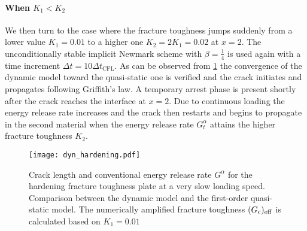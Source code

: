 \paragraph{When $K_1<K_2$} We then turn to the case where the fracture toughness jumps suddenly from a lower value $K_1=0.01$ to a higher one $K_2=2K_1=0.02$ at $x=2$. The unconditionally stable implicit Newmark scheme with $\beta=\frac{1}{4}$ is used again with a time increment $\Delta t=10\Delta t_\mathrm{CFL}$. As can be observed from \cref{fig:hardGcqs} the convergence of the dynamic model toward the quasi-static one is verified and the crack initiates and propagates following Griffith's law. A temporary arrest phase is present shortly after the crack reaches the interface at $x=2$. Due to continuous loading the energy release rate increases and the crack then restarts and begins to propagate in the second material when the energy release rate $G^\alpha_t$ attains the higher fracture toughness $K_2$.
\begin{figure}[htbp]
\centering
\texttt{[image: dyn\_hardening.pdf]}
\caption{Crack length and conventional energy release rate $G^\alpha$ for the hardening fracture toughness plate at a very slow loading speed. Comparison between the dynamic model and the first-order quasi-static model. The numerically amplified fracture toughness $(G_\mathrm{c})_\mathrm{eff}$ is calculated based on $K_1=0.01$} \label{fig:hardGcqs}
\end{figure}

